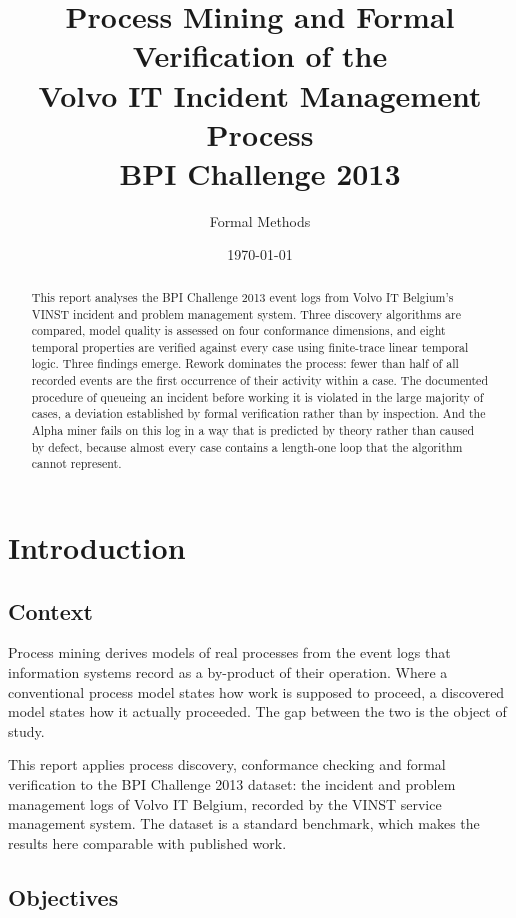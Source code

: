 \documentclass[12pt,a4paper]{article}
\title{Process Mining and Formal Verification of the\\
       Volvo IT Incident Management Process\\
       \large BPI Challenge 2013}
\author{Formal Methods}
\date{\today}
\begin{document}
\maketitle

\begin{abstract}
This report analyses the BPI Challenge 2013 event logs from Volvo IT Belgium's
VINST incident and problem management system. Three discovery algorithms are
compared, model quality is assessed on four conformance dimensions, and eight
temporal properties are verified against every case using finite-trace linear
temporal logic. Three findings emerge. Rework dominates the process: fewer than
half of all recorded events are the first occurrence of their activity within a
case. The documented procedure of queueing an incident before working it is
violated in the large majority of cases, a deviation established by formal
verification rather than by inspection. And the Alpha miner fails on this log in
a way that is predicted by theory rather than caused by defect, because almost
every case contains a length-one loop that the algorithm cannot represent.
\end{abstract}

\tableofcontents
\newpage

\section{Introduction}

\subsection{Context}

Process mining derives models of real processes from the event logs that
information systems record as a by-product of their operation. Where a
conventional process model states how work is supposed to proceed, a discovered
model states how it actually proceeded. The gap between the two is the object of
study.

This report applies process discovery, conformance checking and formal
verification to the BPI Challenge 2013 dataset: the incident and problem
management logs of Volvo IT Belgium, recorded by the VINST service management
system. The dataset is a standard benchmark, which makes the results here
comparable with published work.

\subsection{Objectives}
\end{document}
